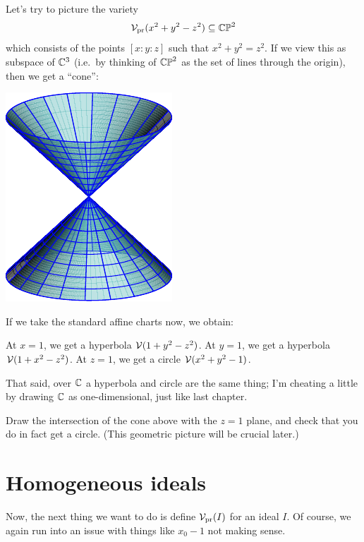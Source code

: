 \begin{example}
	Let's try to picture the variety
	\[ \mathcal V_{\text{pr}}(x^2+y^2-z^2) \subseteq \mathbb{CP}^2 \]
	which consists of the points $[x:y:z]$ such that $x^2+y^2=z^2$.
	If we view this as subspace of $\mathbb C^3$
	(i.e.\ by thinking of $\mathbb{CP}^2$ as the set of lines through the origin),
	then we get a ``cone'':
	\begin{center}
		\includegraphics{media/cone.pdf}
	\end{center}

	If we take the standard affine charts now, we obtain:
	\begin{itemize}
		\ii At $x=1$, we get a hyperbola $\mathcal V(1+y^2-z^2)$.
		\ii At $y=1$, we get a hyperbola $\mathcal V(1+x^2-z^2)$.
		\ii At $z=1$, we get a circle $\mathcal V(x^2+y^2-1)$.
	\end{itemize}
	That said, over $\mathbb C$ a hyperbola and circle
	are the same thing; I'm cheating a little by drawing $\mathbb C$
	as one-dimensional, just like last chapter.
\end{example}
\begin{ques}
	Draw the intersection of the cone above
	with the $z=1$ plane, and check that you do in fact get a circle.
	(This geometric picture will be crucial later.)
\end{ques}

\section{Homogeneous ideals}
Now, the next thing we want to do is define $\mathcal V_{\text{pr}}(I)$ for an ideal $I$.
Of course, we again run into an issue with things like $x_0-1$ not
making sense. 

